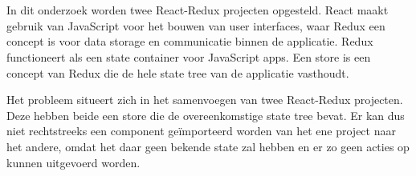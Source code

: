 
%
%

%



\chapter*{}

In dit onderzoek worden twee React-Redux projecten opgesteld. React maakt gebruik van JavaScript voor het bouwen van user interfaces, waar Redux een concept is voor data storage en communicatie binnen de applicatie. Redux functioneert als een state container voor JavaScript apps. Een store is een concept van Redux die de hele state tree van de applicatie vasthoudt.

Het probleem situeert zich in het samenvoegen van twee React-Redux projecten. Deze hebben beide een store die de overeenkomstige state tree bevat. Er kan dus niet rechtstreeks een component geïmporteerd worden van het ene project naar het andere, omdat het daar geen bekende state zal hebben en er zo geen acties op kunnen uitgevoerd worden.

